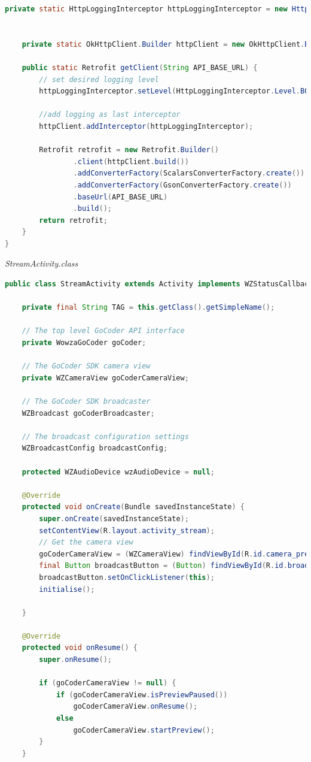 \documentclass{article}
\begin{document}
\begin{landscape}
\begin{lstlisting}[language=Java,basicstyle=\tiny]
    private static HttpLoggingInterceptor httpLoggingInterceptor = new HttpLoggingInterceptor();


    private static OkHttpClient.Builder httpClient = new OkHttpClient.Builder();

    public static Retrofit getClient(String API_BASE_URL) {
        // set desired logging level
        httpLoggingInterceptor.setLevel(HttpLoggingInterceptor.Level.BODY);

        //add logging as last interceptor
        httpClient.addInterceptor(httpLoggingInterceptor);

        Retrofit retrofit = new Retrofit.Builder()
                .client(httpClient.build())
                .addConverterFactory(ScalarsConverterFactory.create())
                .addConverterFactory(GsonConverterFactory.create())
                .baseUrl(API_BASE_URL)
                .build();
        return retrofit;
    }
}
\end{lstlisting}
{\large \textit{StreamActivity.class}}
\begin{lstlisting}[language=Java,basicstyle=\tiny]
public class StreamActivity extends Activity implements WZStatusCallback, View.OnClickListener{

    private final String TAG = this.getClass().getSimpleName();

    // The top level GoCoder API interface
    private WowzaGoCoder goCoder;

    // The GoCoder SDK camera view
    private WZCameraView goCoderCameraView;

    // The GoCoder SDK broadcaster
    WZBroadcast goCoderBroadcaster;

    // The broadcast configuration settings
    WZBroadcastConfig broadcastConfig;

    protected WZAudioDevice wzAudioDevice = null;

    @Override
    protected void onCreate(Bundle savedInstanceState) {
        super.onCreate(savedInstanceState);
        setContentView(R.layout.activity_stream);
        // Get the camera view
        goCoderCameraView = (WZCameraView) findViewById(R.id.camera_preview);
        final Button broadcastButton = (Button) findViewById(R.id.broadcast_button);
        broadcastButton.setOnClickListener(this);
        initialise();

    }

    @Override
    protected void onResume() {
        super.onResume();

        if (goCoderCameraView != null) {
            if (goCoderCameraView.isPreviewPaused())
                goCoderCameraView.onResume();
            else
                goCoderCameraView.startPreview();
        }
    }


\end{lstlisting}
\end{landscape}
\end{document}
